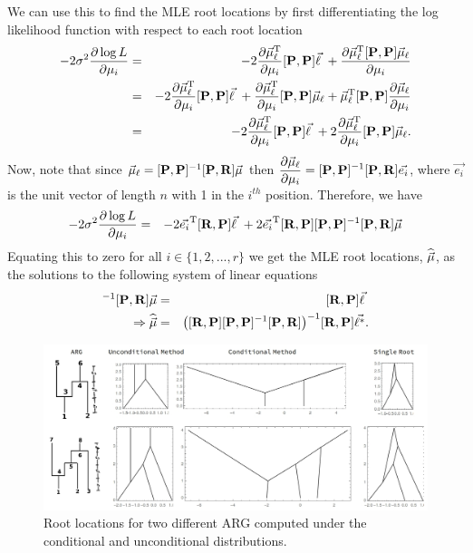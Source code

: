 We can use this to find the MLE root locations by first differentiating the log likelihood function with respect to each root location
\begin{eqnarray}
    -2 \sigma^2\frac{\partial \log L}{\partial \mu_i} &=& -2 \frac{\partial \vec{\mu}_\ell^{\text{T}}}{\partial \mu_i}[\mathbf{P},\mathbf{P}]\vec{\ell} \  + \frac{\partial \vec{\mu}_\ell^{\text{T}} [\mathbf{P},\mathbf{P}] \vec{\mu}_\ell}{\partial \mu_i} \\
    &=& -2 \frac{\partial \vec{\mu}_\ell^{\text{T}}}{\partial \mu_i}[\mathbf{P},\mathbf{P}]\vec{\ell} \  + \frac{\partial \vec{\mu}_\ell^{\text{T}}}{\partial \mu_i} [\mathbf{P},\mathbf{P}] \vec{\mu}_\ell +  \vec{\mu}_\ell^{\text{T}} [\mathbf{P},\mathbf{P}]\frac{\partial \vec{\mu}_\ell}{\partial \mu_i} \\
    &=& -2 \frac{\partial \vec{\mu}_\ell^{\text{T}}}{\partial \mu_i}[\mathbf{P},\mathbf{P}]\vec{\ell} \  + 2\frac{\partial \vec{\mu}_\ell^{\text{T}}}{\partial \mu_i} [\mathbf{P},\mathbf{P}] \vec{\mu}_\ell.
\end{eqnarray}
Now, note that since $\vec{\mu}_\ell = [\mathbf{P}, \mathbf{P}]^{-1}[\mathbf{P},\mathbf{R}]\vec{\mu}$ then $\displaystyle \frac{\partial \vec{\mu}_\ell}{\partial \mu_i} = [\mathbf{P}, \mathbf{P}]^{-1}[\mathbf{P},\mathbf{R}] \vec{e_i}$, where $\vec{e_i}$ is the unit vector of length $n$ with 1 in the $i^{th}$ position. Therefore, we have
\begin{eqnarray}
    -2 \sigma^2\frac{\partial \log L}{\partial \mu_i} &=& -2 \vec{e_i}^{\text{T}} [\mathbf{R},\mathbf{P}]\vec{\ell} \  + 2 \vec{e_i}^{\text{T}} [\mathbf{R},\mathbf{P}] [\mathbf{P}, \mathbf{P}]^{-1}[\mathbf{P},\mathbf{R}]\vec{\mu}
\end{eqnarray}
Equating this to zero for all $i \in \{1,2,...,r\}$ we get the MLE root locations, $\widehat{\vec{\mu}}$, as the solutions to the following system of linear equations 
\begin{eqnarray}
    [\Rp,\Pp] [\Pp, \Pp]^{-1}[\Pp,\Rp]{\muvec} &=& [\Rp,\Pp]\lvec \\
    \Rightarrow \widehat{\muvec} &=& \big( [\Rp,\Pp] [\Pp, \Pp]^{-1}[\Pp,\Rp] \big)^{-1} [\Rp,\Pp]\ldata.
\end{eqnarray}

\begin{figure}[ht]
    \centering
    \includegraphics[width=\linewidth]{Images/SupplementaryFigures/MultipleRoots/RootLocationMethod.jpg}
    \caption{Root locations for two different ARG computed under the conditional and unconditional distributions. }
    \label{fig:RootLocationMethod}
\end{figure}

